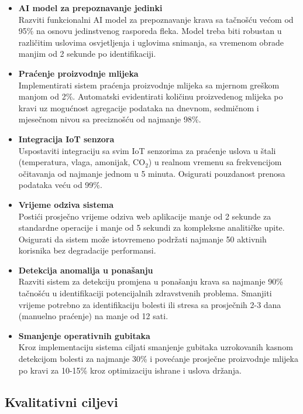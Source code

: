 \documentclass{article}
\begin{document}
\begin{itemize}
\item \textbf{AI model za prepoznavanje jedinki}\\
Razviti funkcionalni AI model za prepoznavanje krava sa tačnošću većom od 95\% na osnovu jedinstvenog rasporeda fleka. Model treba biti robustan u različitim uslovima osvjetljenja i uglovima snimanja, sa vremenom obrade manjim od 2 sekunde po identifikaciji.

\item \textbf{Praćenje proizvodnje mlijeka}\\
Implementirati sistem praćenja proizvodnje mlijeka sa mjernom greškom manjom od 2\%. Automatski evidentirati količinu proizvedenog mlijeka po kravi uz mogućnost agregacije podataka na dnevnom, sedmičnom i mjesečnom nivou sa preciznošću od najmanje 98\%.

\item \textbf{Integracija IoT senzora}\\
Uspostaviti integraciju sa svim IoT senzorima za praćenje uslova u štali (temperatura, vlaga, amonijak, CO$_2$) u realnom vremenu sa frekvencijom očitavanja od najmanje jednom u 5 minuta. Osigurati pouzdanost prenosa podataka veću od 99\%.

\item \textbf{Vrijeme odziva sistema}\\
Postići prosječno vrijeme odziva web aplikacije manje od 2 sekunde za standardne operacije i manje od 5 sekundi za kompleksne analitičke upite. Osigurati da sistem može istovremeno podržati najmanje 50 aktivnih korisnika bez degradacije performansi.

\item \textbf{Detekcija anomalija u ponašanju}\\
Razviti sistem za detekciju promjena u ponašanju krava sa najmanje 90\% tačnošću u identifikaciji potencijalnih zdravstvenih problema. Smanjiti vrijeme potrebno za identifikaciju bolesti ili stresa sa prosječnih 2-3 dana (manuelno praćenje) na manje od 12 sati.

\item \textbf{Smanjenje operativnih gubitaka}\\
Kroz implementaciju sistema ciljati smanjenje gubitaka uzrokovanih kasnom detekcijom bolesti za najmanje 30\% i povećanje prosječne proizvodnje mlijeka po kravi za 10-15\% kroz optimizaciju ishrane i uslova držanja.
\end{itemize}

\subsection{Kvalitativni ciljevi}
\end{document}
